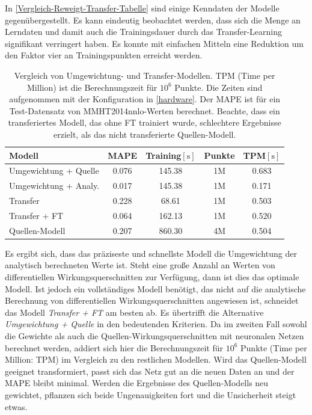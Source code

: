 In \textsf{\autoref{Vergleich-Reweigt-Transfer-Tabelle}} sind einige Kenndaten der Modelle gegenübergestellt. Es kann eindeutig beobachtet werden, dass sich die Menge an Lerndaten und damit auch die Trainingsdauer durch das Transfer-Learning signifikant verringert haben. Es konnte mit einfachen Mitteln eine Reduktion um den Faktor vier an Trainingspunkten erreicht werden.
\begin{table} 
	\centering
	\captionsetup{justification=justified}
	\caption{Vergleich von Umgewichtung- und Transfer-Modellen. TPM (Time per Million) ist die Berechnungszeit für $10^{6}$ Punkte. Die Zeiten sind aufgenommen mit der Konfiguration in \textsf{\autoref{hardware}}. Der MAPE ist für ein Test-Datensatz von MMHT2014nnlo-Werten berechnet. Beachte, dass ein transferiertes Modell, das ohne FT trainiert wurde, schlechtere Ergebnisse erzielt, als das nicht transferierte Quellen-Modell.}
	\begin{tabular}{|l|c|c|c|c|}
		\hline
		Modell & MAPE & Training$[\text{s}]$ & Punkte & TPM$[\text{s}]$ \\
		\hline
		Umgewichtung + Quelle & 0.076 & 145.38 & 1M & 0.683 \\
		Umgewichtung + Analy. &  0.017 & 145.38 & 1M & 0.171 \\
		Transfer & 0.228 & 68.61 & 1M & 0.503\\
		Transfer + FT & 0.064 & 162.13 & 1M & 0.520 \\
		Quellen-Modell & 0.207 & 860.30 & 4M & 0.504\\
		\hline
	\end{tabular}
	\label{Vergleich-Reweigt-Transfer-Tabelle}
\end{table}
Es ergibt sich, dass das präziseste und schnellste Modell die Umgewichtung der analytisch berechneten Werte ist. Steht eine große Anzahl an Werten von differentiellen Wirkungsquerschnitten zur Verfügung, dann ist dies das optimale Modell. Ist jedoch ein vollständiges Modell benötigt, das nicht auf die analytische Berechnung von differentiellen Wirkungsquerschnitten angewiesen ist, schneidet das Modell \textit{Transfer + FT} am besten ab. Es übertrifft die Alternative \textit{Umgewichtung + Quelle} in den bedeutenden Kriterien. Da im zweiten Fall sowohl die Gewichte als auch die Quellen-Wirkungsquerschnitten mit neuronalen Netzen berechnet werden, addiert sich hier die Berechnungszeit für $10^{6}$ Punkte (Time per Million: TPM) im Vergleich zu den restlichen Modellen. Wird das Quellen-Modell geeignet transformiert, passt sich das Netz gut an die neuen Daten an und der MAPE bleibt minimal. Werden die Ergebnisse des Quellen-Modells neu gewichtet, pflanzen sich beide Ungenauigkeiten fort und die Unsicherheit steigt etwas.

